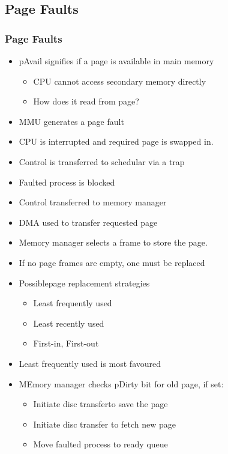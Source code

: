 \documentclass{beamer}
\begin{document}
\subsection{Page Faults}
\begin{frame}[allowframebreaks]
\frametitle{Page Faults}
\begin{itemize}
\item pAvail signifies if a page is available in main memory
\begin{itemize}
\item CPU cannot access secondary memory directly
\item How does it read from page?
\end{itemize}
\item MMU generates a page fault
\item CPU is interrupted and required page is swapped in.
\item Control is transferred to schedular via a trap
\item Faulted process is blocked
\item Control transferred to memory manager
\item DMA used to transfer requested page
\item Memory manager selects a frame to store the page.
\item If no page frames are empty, one must be replaced
\item Possiblepage replacement strategies
\begin{itemize}
\item Least frequently used
\item Least recently used
\item First-in, First-out
\end{itemize}
\item Least frequently used is most favoured
\item MEmory manager checks pDirty bit for old page, if set:
\begin{itemize}
\item Initiate disc transferto save the page
\item Initiate disc transfer to fetch new page
\item Move faulted process to ready queue
\end{itemize}
\end{itemize}
\end{frame}
\end{document}
